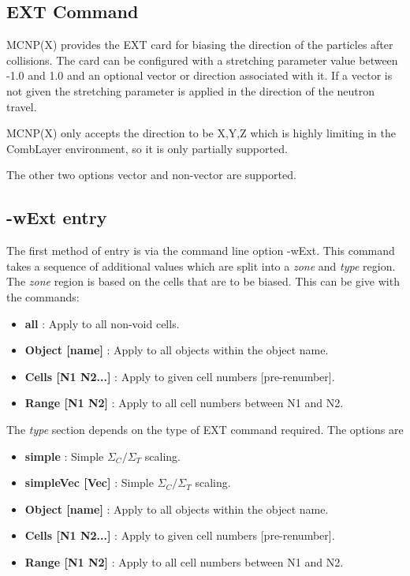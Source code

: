 
\subsection{EXT Command}

MCNP(X) provides the EXT card for biasing the direction of the
particles after collisions. The card can be configured with a
stretching parameter value between -1.0 and 1.0 and an optional vector
or direction associated with it. If a vector is not given the
stretching parameter is applied in the direction of the neutron travel.

MCNP(X) only accepts the direction to be X,Y,Z which is highly
limiting in the CombLayer environment, so it is only partially supported.

The other two options vector and non-vector are supported.

\subsection{-wExt entry}

The first method of entry is via the command line option -wExt. This
command takes a sequence of additional values which are split into a
{\it zone} and {\it type} region. The {\it zone} region is based on
the cells that are to be biased. This can be give with the commands:

\begin{itemize}
\item{ {\bf all} : Apply to all non-void cells.}
\item{ {\bf Object [name]} : Apply to all objects within the object name.}
\item{ {\bf Cells [N1 N2...]} : Apply to given cell numbers [pre-renumber].}
\item{ {\bf Range [N1  N2]} : Apply to all cell numbers between N1 and N2.}
\end{itemize}

The {\it type} section depends on the type of EXT command required. The options are

\begin{itemize}
\item{ {\bf simple} : Simple $\Sigma_C/\Sigma_T$ scaling.}
\item{ {\bf simpleVec [Vec]} : Simple $\Sigma_C/\Sigma_T$ scaling.} 
\item{ {\bf Object [name]} : Apply to all objects within the object name.}
\item{ {\bf Cells [N1 N2...]} : Apply to given cell numbers [pre-renumber].}
\item{ {\bf Range [N1  N2]} : Apply to all cell numbers between N1 and N2. } 
\end{itemize}



